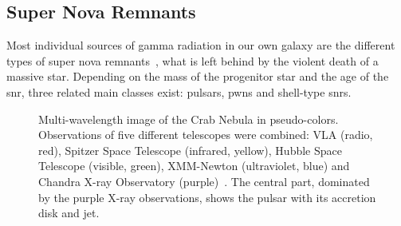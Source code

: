 \subsection{Super Nova Remnants}
Most individual sources of gamma radiation in our own galaxy are the different types
of super nova remnants~\cite{tevcat, 4fgl}, what is left behind by the violent
death of a massive star.
Depending on the mass of the progenitor star and the age of the \gls{snr}, 
three related main classes exist: pulsars, \glspl{pwn} and shell-type \glspl{snr}.


\begin{figure}
  \begin{captionbeside}{
    Multi-wavelength image of the Crab Nebula in pseudo-colors.
    Observations of five different telescopes were combined:
    VLA (radio, red), Spitzer Space Telescope (infrared, yellow), Hubble Space Telescope (visible, green),  XMM-Newton (ultraviolet, blue) and Chandra X-ray Observatory (purple)~\cite{crab-mwl}.
    The central part, dominated by the purple X-ray observations, shows the pulsar with its accretion disk and jet.
  }%
    \small%
  \end{captionbeside}\label{fig:crab}
\end{figure}

